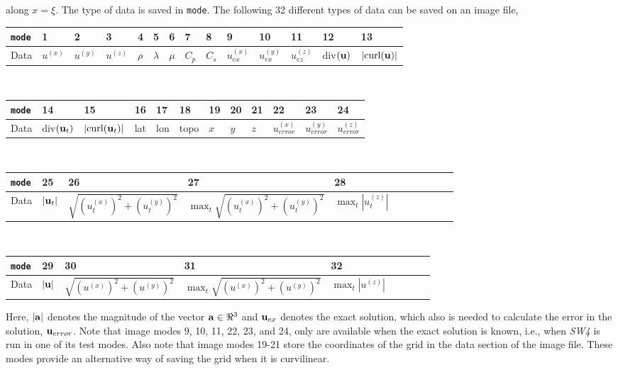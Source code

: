 \documentclass[11pt]{report}
\newcommand{\ub}{{\bf u}}
\begin{document}
along $x=\xi$. The type of data is saved in {\tt mode}. The following 32 different types of data can
be saved on an image file,
\begin{flushleft}
\begin{tabular}{l||l|l|l|l|l|l|l|l|l|l|l|l|l}\hline
{\tt mode} & 1 & 2 & 3 & 4 & 5 & 6 & 7 & 8 & 9 & 10 & 11 & 12 & 13\\ \hline
Data & $u^{(x)}$ & $u^{(y)}$ & $u^{(z)}$ & $\rho$ & $\lambda$ & $\mu$ & $C_p$ & $C_s$ & $u_{ex}^{(x)}$
& $u_{ex}^{(y)}$ & $u_{ez}^{(z)}$ & div$(\ub)$ & $|\mbox{curl($\ub$)}|$ \\ \hline
\end{tabular}\\
\medskip
\begin{tabular}{l||l|l|l|l|l|l|l|l|l|l|l}\hline
{\tt mode}  & 14 & 15 & 16 & 17 & 18 & 19 & 20 & 21 & 22 & 23 & 24 \\ \hline\hline
Data & div$(\ub_t)$ & $|\mbox{curl($\ub_t$)}|$ & lat & lon &
topo & $x$ & $y$ & $z$ & $u_{error}^{(x)}$ & $u_{error}^{(y)}$ & $u_{error}^{(z)}$  \\ \hline
\end{tabular}\\
\medskip
\begin{tabular}{l||l|l|l|lllllll}\hline
{\tt mode} & 25 & 26 & 27 & 28 \\ \hline
Data & $|\ub_t|$ & $\sqrt{(u_t^{(x)})^2+(u_t^{(y)})^2}$ & $\max_t\sqrt{(u_t^{(x)})^2+(u_t^{(y)})^2}$
& $\max_t \left| u^{(z)}_t \right|$ 
\\ \hline
\end{tabular}\\
\medskip
\begin{tabular}{l||l|l|l|lllll}\hline
{\tt mode} & 29 & 30 & 31 & 32 \\ \hline
Data & $|\ub|$ & $\sqrt{(u^{(x)})^2+(u^{(y)})^2}$ & $\max_t\sqrt{(u^{(x)})^2+(u^{(y)})^2}$ & $\max_t
\left| u^{(z)} \right|$ \\ \hline 
\end{tabular}
\end{flushleft}
Here, $|{\bf a}|$ denotes the magnitude of the vector ${\bf a}\in\Re^3$ and $\ub_{ex}$ denotes the
exact solution, which also is needed to calculate the error in the solution, $\ub_{error}$. Note
that image modes 9, 10, 11, 22, 23, and 24, only are available when the exact solution is known,
i.e., when \emph{SW4} is run in one of its test modes. Also note that image modes 19-21 store the
coordinates of the grid in the data section of the image file. These modes provide an alternative
way of saving the grid when it is curvilinear.
\end{document}
